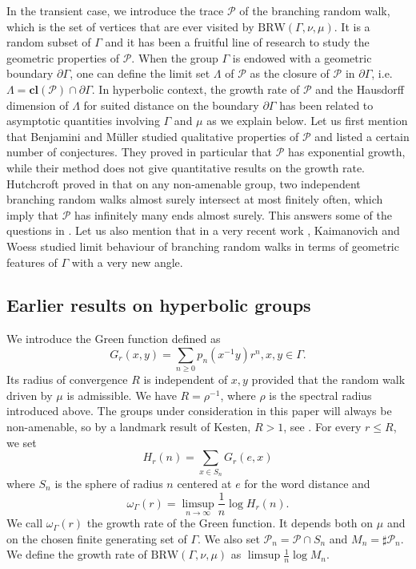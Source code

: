 \documentclass{amsart}
\theoremstyle{definition}
\theoremstyle{remark}
\begin{document}
In the transient case, we introduce the trace $\mathcal{P}$ of the branching random walk, which is the set of vertices that are ever visited by $\mathrm{BRW}(\Gamma,\nu,\mu)$.
It is a random subset of $\Gamma$ and it has been a fruitful line of research to study the geometric properties of $\mathcal{P}$.
When the group $\Gamma$ is endowed with a geometric boundary $\partial \Gamma$, one can define the limit set $\Lambda$ of $\mathcal{P}$ as the closure of $\mathcal{P}$ in $\partial \Gamma$, i.e.\ $\Lambda=\mathbf{cl}(\mathcal{P})\cap \partial\Gamma$.
In hyperbolic context, the growth rate of $\mathcal{P}$ and the Hausdorff dimension of $\Lambda$ for suited distance on the boundary $\partial \Gamma$ has been related to asymptotic quantities involving $\Gamma$ and $\mu$ as we explain below.
Let us first mention that Benjamini and M\"uller \cite{BM12} studied qualitative properties of $\mathcal{P}$ and listed a certain number of conjectures. They proved in particular that $\mathcal{P}$ has exponential growth, while their method does not give quantitative results on the growth rate.
Hutchcroft proved in \cite{Hutchcroft20} that on any non-amenable group, two independent branching random walks almost surely intersect at most finitely often, which imply that $\mathcal{P}$ has infinitely many ends almost surely.
This answers some of the questions in \cite{BM12}.
Let us also mention that in a very recent work \cite{KaimanovichWoess}, Kaimanovich and Woess studied limit behaviour of branching random walks in terms of geometric features of $\Gamma$ with a very new angle.

\subsection{Earlier results on hyperbolic groups}
We introduce the Green function defined as
$$G_r(x,y)=\sum_{n\geq 0}p_n(x^{-1}y)r^n,x,y\in \Gamma.$$
Its radius of convergence $R$ is independent of $x,y$ provided that the random walk driven by $\mu$ is admissible. We have $R=\rho^{-1}$, where $\rho$ is the spectral radius introduced above.
The groups under consideration in this paper will always be non-amenable, so by a landmark result of Kesten, $R>1$, see \cite[Corollary~12.5]{Woessbook}.
For every $r\leq R$, we set
$$H_r(n)=\sum_{x\in S_n}G_r(e,x)$$
where $S_n$ is the sphere of radius $n$ centered at $e$ for the word distance
and
$$\omega_\Gamma(r)=\limsup_{n\to \infty}\frac{1}{n}\log H_r(n).$$
We call $\omega_\Gamma(r)$ the growth rate of the Green function.
It depends both on $\mu$ and on the chosen finite generating set of $\Gamma$.
We also set $\mathcal{P}_n=\mathcal{P}\cap S_n$ and $M_n=\sharp \mathcal{P}_n$.
We define the growth rate of $\mathrm{BRW}(\Gamma,\nu,\mu)$ as $\limsup \frac{1}{n}\log M_n$.
\end{document}
